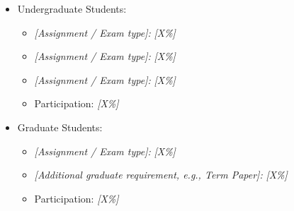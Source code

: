 \begin{itemize}
\item Undergraduate Students:
\begin{itemize}
\item \textit{[Assignment / Exam type]:} \textit{[X\%]}
\item \textit{[Assignment / Exam type]:} \textit{[X\%]}
\item \textit{[Assignment / Exam type]:} \textit{[X\%]}
\item Participation: \textit{[X\%]}
\end{itemize}
\item Graduate Students:
\begin{itemize}
\item \textit{[Assignment / Exam type]:} \textit{[X\%]}
\item \textit{[Additional graduate requirement, e.g., Term Paper]:} \textit{[X\%]}
\item Participation: \textit{[X\%]}
\end{itemize}
\end{itemize}

